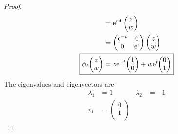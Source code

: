 \documentclass[../psets.tex]{subfiles}
\begin{document}
\begin{enumerate}
\begin{enumerate}
\begin{proof}
\begin{align*}
                &= \e[tA]
                \begin{pmatrix}
                    z\\
                    w\\
                \end{pmatrix}\\
                &=
                \begin{pmatrix}
                    \e[-t] & 0\\
                    0 & \e[t]\\
                \end{pmatrix}
                \begin{pmatrix}
                    z\\
                    w\\
                \end{pmatrix}\\
                \Aboxed{
                    \phi_t{
                        \begin{pmatrix}
                            z\\
                            w\\
                        \end{pmatrix}
                    }
                    &= z\e[-t]{
                        \begin{pmatrix}
                            1\\
                            0\\
                        \end{pmatrix}
                    }+w\e[t]{
                        \begin{pmatrix}
                            0\\
                            1\\
                        \end{pmatrix}
                    }
                }
            \end{align*}
            The eigenvalues and eigenvectors are
            \begin{align*}
                \lambda_1 &= 1&
                    \lambda_2 &= -1\\
                v_1 &=
                \begin{pmatrix}
                    0\\
                    1\\
                \end{pmatrix}&

\end{align*}
\end{proof}
\end{enumerate}
\end{enumerate}
\end{document}
